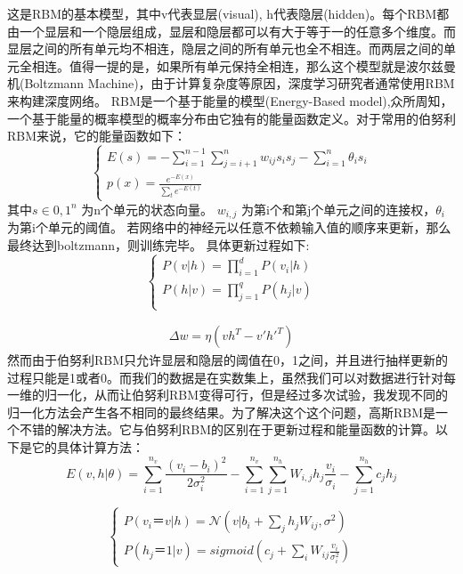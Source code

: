 	这是RBM的基本模型，其中v代表显层(visual), h代表隐层(hidden)。每个RBM都由一个显层和一个隐层组成，显层和隐层都可以有大于等于一的任意多个维度。而显层之间的所有单元均不相连，隐层之间的所有单元也全不相连。而两层之间的单元全相连。值得一提的是，如果所有单元保持全相连，那么这个模型就是波尔兹曼机(Boltzmann Machine)，由于计算复杂度等原因，深度学习研究者通常使用RBM来构建深度网络。
	RBM是一个基于能量的模型(Energy-Based model),众所周知，一个基于能量的概率模型的概率分布由它独有的能量函数定义。对于常用的伯努利RBM来说，它的能量函数如下：
	\begin{equation}
	\begin{cases}
	E(s) = -\sum\limits_{i=1}^{n-1}\sum\limits_{j = i + 1}^{n} w_{ij}s_is_j - \sum\limits_{i=1}^n \theta_i s_i \\
	p(x) = \frac{e^{-E(x)}}{\sum\limits_t e^{-E(t)}}
	\end{cases}
	\end{equation}
	其中$s \in {0, 1}^n$  为n个单元的状态向量。 $w_{i, j}$ 为第i个和第j个单元之间的连接权，$\theta_i$为第i个单元的阈值。
	若网络中的神经元以任意不依赖输入值的顺序来更新，那么最终达到boltzmann，则训练完毕。
	具体更新过程如下:
	\begin{equation}
	\begin{cases}
	P(v|h) = \prod\limits_{i=1}^d P(v_i |h)\\
	P(h|v) = \prod\limits_{j=1}^q P(h_j |v)\\
	\end{cases}
	\end{equation}
	
	\begin{align}
	\Delta w = \eta(vh^T - v\prime {h\prime}^T)
	\end{align}
	然而由于伯努利RBM只允许显层和隐层的阈值在0，1之间，并且进行抽样更新的过程只能是1或者0。而我们的数据是在实数集上，虽然我们可以对数据进行针对每一维的归一化，从而让伯努利RBM变得可行，但是经过多次试验，我发现不同的归一化方法会产生各不相同的最终结果。为了解决这个这个问题，高斯RBM是一个不错的解决方法。它与伯努利RBM的区别在于更新过程和能量函数的计算。以下是它的具体计算方法：
	\begin{equation}
	E(v,h | \theta) = \sum\limits_{i=1}^{n_v}\frac{(v_i - b_i)^2}{2\sigma_i^2} - \sum\limits_{i=1}^{n_v}\sum\limits_{j=1}^{n_h} W_{i,j}h_j\frac{v_i}{\sigma_i} - \sum\limits_{j=1}^{n_h}c_jh_j
	\end{equation}
	
	\begin{equation}
	\begin{cases}
	P(v_i ＝ v|h) = \mathcal{N}(v | b_i + \sum\limits_{j}h_jW_{ij}, \sigma^2)\\
	P(h_j ＝ 1|v) = sigmoid(c_j + \sum\limits_i W_{ij} \frac{v_i}{\sigma_i^2})
	\end{cases}
	\end{equation}
	
